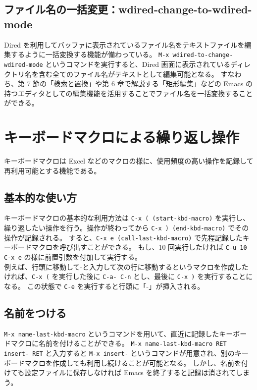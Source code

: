 \subsection{ファイル名の一括変更：wdired-change-to-wdired-mode}
Dired を利用してバッファに表示されているファイル名をテキストファイルを編集するように一括変換する機能が備わっている。
\texttt{M-x wdired-to-change-wdired-mode} というコマンドを実行すると、Dired 画面に表示されているディレクトリ名を含む全てのファイル名がテキストとして編集可能となる。
すなわち、第 7 節の「検索と置換」や第 6 章で解説する「矩形編集」などの Emacs の持つエディタとしての編集機能を活用することでファイル名を一括変換することができる。
\section{キーボードマクロによる繰り返し操作}
キーボードマクロは Excel などのマクロの様に、使用頻度の高い操作を記録して再利用可能とする機能である。
\subsection{基本的な使い方}
キーボードマクロの基本的な利用方法は \verb|C-x ( (start-kbd-macro)| を実行し、繰り返したい操作を行う。操作が終わってから \verb|C-x ) (end-kbd-macro)| でその操作が記録される。
すると、\texttt{C-x e (call-last-kbd-macro)} で先程記録したキーボードマクロを呼び出すことができる。
もし、10 回実行したければ \texttt{C-u 10 C-x e} の様に前置引数を付加して実行する。\\

例えば、行頭に移動して{-}と入力して次の行に移動するというマクロを作成したければ、\verb|C-x (| を実行した後に \texttt{C-a- C-n} とし、最後に \verb|C-x )| を実行することになる。
この状態で \texttt{C-e} を実行すると行頭に「{-}」が挿入される。
\subsection{名前をつける}
\texttt{M-x name-last-kbd-macro} というコマンドを用いて、直近に記録したキーボードマクロに名前を付けることができる。
\texttt{M-x name-last-kbd-macro RET insert- RET} と入力すると \texttt{M-x insert-} というコマンドが用意され、別のキーボードマクロを作成しても利用し続けることが可能となる。
しかし、名前を付けても設定ファイルに保存しなければ Emacs を終了すると記録は消されてしまう。
